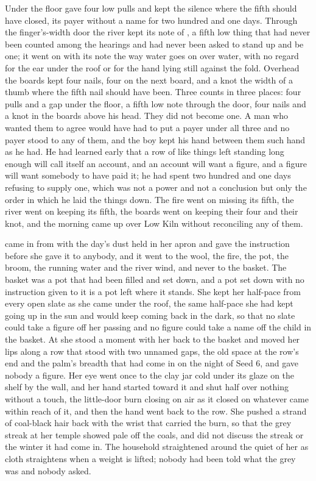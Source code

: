 Under the floor  gave four low pulls and kept the silence where the fifth should have closed, its payer without a name for two hundred and one days. Through the finger's-width door the river kept its note of , a fifth low thing that had never been counted among the hearings and had never been asked to stand up and be one; it went on with its note the way water goes on over water, with no regard for the ear under the roof or for the hand lying still against the fold. Overhead the boards kept four nails, four on the next board, and a knot the width of a thumb where the fifth nail should have been. Three counts in three places: four pulls and a gap under the floor, a fifth low note through the door, four nails and a knot in the boards above his head. They did not become one. A man who wanted them to agree would have had to put a payer under all three and no payer stood to any of them, and the boy kept his hand between them such hand as he had. He had learned early that a row of like things left standing long enough will call itself an account, and an account will want a figure, and a figure will want somebody to have paid it; he had spent two hundred and one days refusing to supply one, which was not a power and not a conclusion but only the order in which he laid the things down. The fire went on missing its fifth, the river went on keeping its fifth, the boards went on keeping their four and their knot, and the morning came up over Low Kiln without reconciling any of them.

\scenebreak

 came in from  with the day's dust held in her apron and gave the instruction before she gave it to anybody, and it went to the wool, the fire, the pot, the broom, the running water and the river wind, and never to the basket. The basket was a pot that had been filled and set down, and a pot set down with no instruction given to it is a pot left where it stands. She kept her half-pace from every open slate as she came under the roof, the same half-pace she had kept going up in the sun and would keep coming back in the dark, so that no slate could take a figure off her passing and no figure could take a name off the child in the basket. At  she stood a moment with her back to the basket and moved her lips along a row that stood with two unnamed gaps, the old space at the row's end and the palm's breadth that had come in on the night of Seed 6, and gave nobody a figure. Her eye went once to the clay jar cold under its glaze on the shelf by the wall, and her hand started toward it and shut half over nothing without a touch, the little-door burn closing on air as it closed on whatever came within reach of it, and then the hand went back to the row. She pushed a strand of coal-black hair back with the wrist that carried the burn, so that the grey streak at her temple showed pale off the coals, and did not discuss the streak or the winter it had come in. The household straightened around the quiet of her as cloth straightens when a weight is lifted; nobody had been told what the grey was and nobody asked.

